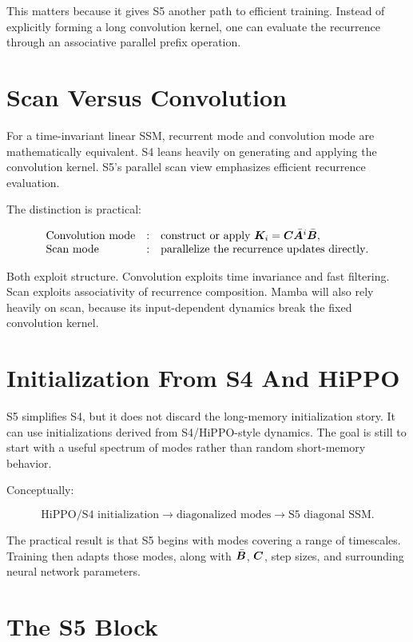 This matters because it gives S5 another path to efficient training. Instead of explicitly
forming a long convolution kernel, one can evaluate the recurrence through an associative
parallel prefix operation.

\section{Scan Versus Convolution}

For a time-invariant linear SSM, recurrent mode and convolution mode are mathematically
equivalent. S4 leans heavily on generating and applying the convolution kernel. S5's
parallel scan view emphasizes efficient recurrence evaluation.

The distinction is practical:

\[
\begin{array}{lll}
\text{Convolution mode} &:& \text{construct or apply } \bm{K}_i=\bm{C}\bar{\bm{A}}^i\bar{\bm{B}}, \\
\text{Scan mode} &:& \text{parallelize the recurrence updates directly}.
\end{array}
\]

Both exploit structure. Convolution exploits time invariance and fast filtering. Scan
exploits associativity of recurrence composition. Mamba will also rely heavily on scan,
because its input-dependent dynamics break the fixed convolution kernel.

\section{Initialization From S4 And HiPPO}

S5 simplifies S4, but it does not discard the long-memory initialization story. It can use
initializations derived from S4/HiPPO-style dynamics. The goal is still to start with a
useful spectrum of modes rather than random short-memory behavior.

Conceptually:

\[
  \text{HiPPO/S4 initialization}
  \rightarrow
  \text{diagonalized modes}
  \rightarrow
  \text{S5 diagonal SSM}.
\]

The practical result is that S5 begins with modes covering a range of timescales. Training
then adapts those modes, along with $\bar{\bm{B}}$, $\bm{C}$, step sizes, and surrounding neural
network parameters.

\section{The S5 Block}

